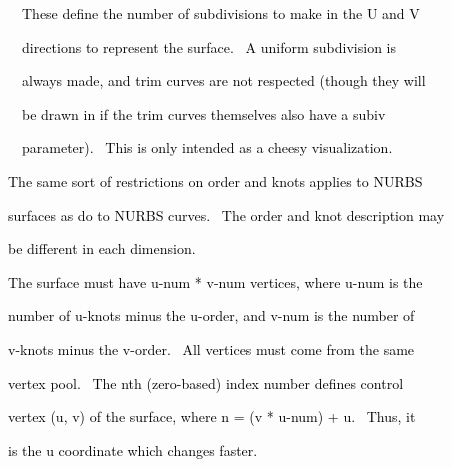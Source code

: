 \documentclass[a4paper]{article}
\newcommand\textstyleOOoComputerKeyWord[1]{\textrm{\textcolor[rgb]{0.0,0.0,0.5019608}{#1}}}
\begin{document}
\bigskip

{\color{black}
\textstyleOOoComputerKeyWord{\textcolor{black}{\ \ \ \ These define the number of subdivisions to make in the U and V}}}

{\color{black}
\textstyleOOoComputerKeyWord{\textcolor{black}{\ \ \ \ directions to represent the surface. \ A uniform subdivision
is}}}

{\color{black}
\textstyleOOoComputerKeyWord{\textcolor{black}{\ \ \ \ always made, and trim curves are not respected (though they
will}}}

{\color{black}
\textstyleOOoComputerKeyWord{\textcolor{black}{\ \ \ \ be drawn in if the trim curves themselves also have a subiv}}}

{\color{black}
\textstyleOOoComputerKeyWord{\textcolor{black}{\ \ \ \ parameter). \ This is only intended as a cheesy visualization.}}}


\bigskip


\bigskip

{\color{black}
\textstyleOOoComputerKeyWord{\textcolor{black}{\ \ The same sort of restrictions on order and knots applies to NURBS}}}

{\color{black}
\textstyleOOoComputerKeyWord{\textcolor{black}{\ \ surfaces as do to NURBS curves. \ The order and knot description
may}}}

{\color{black}
\textstyleOOoComputerKeyWord{\textcolor{black}{\ \ be different in each dimension.}}}


\bigskip

{\color{black}
\textstyleOOoComputerKeyWord{\textcolor{black}{\ \ The surface must have u-num * v-num vertices, where u-num is the}}}

{\color{black}
\textstyleOOoComputerKeyWord{\textcolor{black}{\ \ number of u-knots minus the u-order, and v-num is the number of}}}

{\color{black}
\textstyleOOoComputerKeyWord{\textcolor{black}{\ \ v-knots minus the v-order. \ All vertices must come from the same}}}

{\color{black}
\textstyleOOoComputerKeyWord{\textcolor{black}{\ \ vertex pool. \ The nth (zero-based) index number defines control}}}

{\color{black}
\textstyleOOoComputerKeyWord{\textcolor{black}{\ \ vertex (u, v) of the surface, where n = (v * u-num) + u. \ Thus,
it}}}

{\color{black}
\textstyleOOoComputerKeyWord{\textcolor{black}{\ \ is the u coordinate which changes faster.}}}
\end{document}
